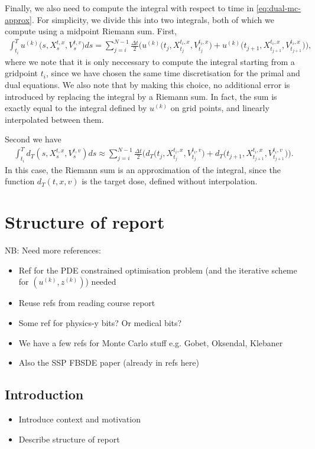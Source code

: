 \documentclass{article}  %
\begin{document}
Finally, we also need to compute the integral with respect to time in \autoref{eq:dual-mc-approx}. For simplicity, we divide this into two integrals, both of which we compute using a midpoint Riemann sum. First,
%
\begin{align}
    \int_{t_i}^{T} u^{(k)}\big(s,X_s^{t,x},V_s^{t,v}\big) ds = \sum_{j=i}^{N-1} \frac{\Delta t}{2} \bigg(u^{(k)}\big(t_j,X_{t_j}^{t_i,x},V_{t_j}^{t_i,x}\big) + u^{(k)}\big(t_{j+1},X_{t_{j+1}}^{t_i,x},V_{t_{j+1}}^{t_i,x}\big)\bigg),
\end{align}
% 
where we note that it is only neccessary to compute the integral starting from a gridpoint $t_i$, since we have chosen the same time discretisation for the primal and dual equations. We also note that by making this choice, no additional error is introduced by replacing the integral by a Riemann sum. In fact, the sum is exactly equal to the integral defined by $u^{(k)}$ on grid points, and linearly interpolated between them. 

Second we have
%
\begin{align}
    \int_{t_i}^{T} d_T(s,X_s^{t,x},V_s^{t,v}) ds \approx \sum_{j=i}^{N-1} \frac{\Delta t}{2} \bigg( d_T\big(t_j,X_{t_j}^{t_i,x},V_{t_j}^{t_i,v}\big) + d_T\big(t_{j+1},X_{t_{j+1}}^{t_i,x},V_{t_{j+1}}^{t_i,v}\big) \bigg).
\end{align}
%
In this case, the Riemann sum is an approximation of the integral, since the function $d_T(t,x,v)$ is the target dose, defined without interpolation.

\section{Structure of report}
NB: Need more references: 

\begin{itemize}
    \item Ref for the PDE constrained optimisation problem (and the iterative scheme for $(u^{(k)},z^{(k)})$) needed
    \item Reuse refs from reading course report 
    \item Some ref for physics-y bits? Or medical bits?
    \item We have a few refs for Monte Carlo stuff e.g. Gobet, Oksendal, Klebaner
    \item Also the SSP FBSDE paper (already in refs here)
\end{itemize}

\subsection{Introduction}
\begin{itemize}
    \item Introduce context and motivation 
    \item Describe structure of report
\end{itemize}
\end{document}
